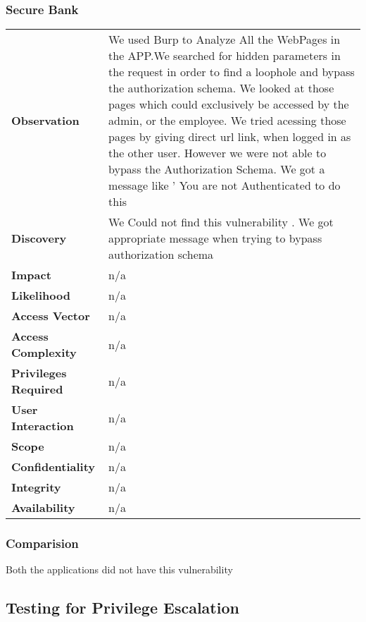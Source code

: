 \subsubsection{Secure Bank}
\begin{tabular}{l|p{10cm}}
\textbf{Observation} & We used Burp to Analyze All the WebPages in the APP.We searched for hidden parameters in the request in order to find a loophole and bypass the authorization schema. We looked at those pages which could exclusively be accessed by the admin, or the employee. We tried acessing those pages by giving direct url link, when logged in as the other user. However we were not able to bypass the Authorization Schema. We got a message like ' You are not Authenticated to do this  \\
\textbf{Discovery} & We Could not find this vulnerability . We got appropriate message when trying to bypass authorization schema \\
\textbf{Impact} &  n/a\\
\textbf{Likelihood} & n/a \\
\textbf{Access Vector} & n/a \\
\textbf{Access Complexity} & n/a \\
\textbf{Privileges Required} & n/a \\
\textbf{User Interaction} & n/a \\
\textbf{Scope} & n/a \\
\textbf{Confidentiality} & n/a \\
\textbf{Integrity} & n/a \\
\textbf{Availability} & n/a \\
\end{tabular}
\subsubsection{Comparision}
Both the applications did not have this vulnerability
\subsection{Testing for Privilege Escalation}
